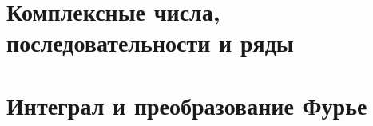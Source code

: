 \documentclass[../main.tex]{subfiles}
\begin{document}
 \chapter{Комплексные числа, последовательности и ряды}
 
 \chapter{Интеграл и преобразование Фурье}
 
\end{document}
